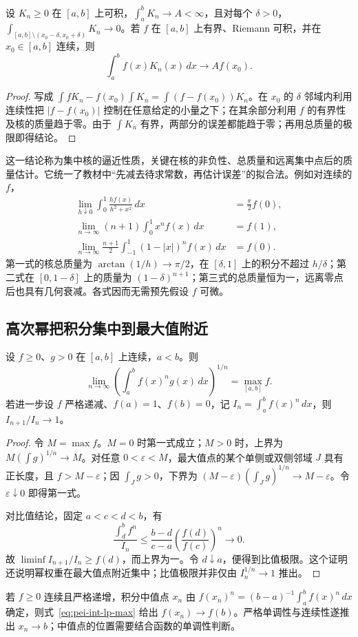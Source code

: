 \begin{theorem}
\label{thm:pei-int-concentrating-kernel}
设 $K_n\ge0$ 在 $[a,b]$ 上可积，$\int_a^bK_n\to A<\infty$，且对每个 $\delta>0$，$\int_{[a,b]\setminus(x_0-\delta,x_0+\delta)}K_n\to0$。若 $f$ 在 $[a,b]$ 上有界、Riemann 可积，并在 $x_0\in[a,b]$ 连续，则
\[
 \int_a^b f(x)K_n(x)\,dx\longrightarrow Af(x_0).
\]
\end{theorem}
\begin{proof}
写成 $\int fK_n-f(x_0)\int K_n=\int(f-f(x_0))K_n$。在 $x_0$ 的 $\delta$ 邻域内利用连续性把 $|f-f(x_0)|$ 控制在任意给定的小量之下；在其余部分利用 $f$ 的有界性及核的质量趋于零。由于 $\int K_n$ 有界，两部分的误差都能趋于零；再用总质量的极限即得结论。
\end{proof}
这一结论称为集中核的逼近性质，关键在核的非负性、总质量和远离集中点后的质量估计。它统一了教材中“先减去待求常数，再估计误差”的拟合法。例如对连续的 $f$，
\begin{align*}
 \lim_{h\downarrow0}\int_0^1\frac{h f(x)}{h^2+x^2}\,dx&=\frac\pi2f(0),\\
 \lim_{n\to\infty}(n+1)\int_0^1x^nf(x)\,dx&=f(1),\\
 \lim_{n\to\infty}\frac{n+1}{2}\int_{-1}^1(1-|x|)^nf(x)\,dx&=f(0).
\end{align*}
第一式的核总质量为 $\arctan(1/h)\to\pi/2$，在 $[\delta,1]$ 上的积分不超过 $h/\delta$；第二式在 $[0,1-\delta]$ 上的质量为 $(1-\delta)^{n+1}$；第三式的总质量恒为一，远离零点后也具有几何衰减。各式因而无需预先假设 $f$ 可微。

\subsection{高次幂把积分集中到最大值附近}
\begin{theorem}
\label{thm:pei-int-power-integral}
设 $f\ge0$、$g>0$ 在 $[a,b]$ 上连续，$a<b$。则
\begin{equation}
 \lim_{n\to\infty}\left(\int_a^bf(x)^ng(x)\,dx\right)^{1/n}
 =\max_{[a,b]}f.
 \label{eq:pei-int-lp-max}
\end{equation}
若进一步设 $f$ 严格递减、$f(a)=1$、$f(b)=0$，记 $I_n=\int_a^bf(x)^n\,dx$，则 $I_{n+1}/I_n\to1$。
\end{theorem}
\begin{proof}
令 $M=\max f$。$M=0$ 时第一式成立；$M>0$ 时，上界为 $M(\int g)^{1/n}\to M$。对任意 $0<\varepsilon<M$，最大值点的某个单侧或双侧邻域 $J$ 具有正长度，且 $f>M-\varepsilon$；因 $\int_Jg>0$，下界为 $(M-\varepsilon)(\int_Jg)^{1/n}\to M-\varepsilon$。令 $\varepsilon\downarrow0$ 即得第一式。

对比值结论，固定 $a<c<d<b$，有
\[
 \frac{\int_d^bf^n}{I_n}\le\frac{b-d}{c-a}\left(\frac{f(d)}{f(c)}\right)^n\longrightarrow0.
\]
故 $\liminf I_{n+1}/I_n\ge f(d)$，而上界为一。令 $d\downarrow a$，便得到比值极限。这个证明还说明幂权重在最大值点附近集中；比值极限并非仅由 $I_n^{1/n}\to1$ 推出。
\end{proof}
若 $f\ge0$ 连续且严格递增，积分中值点 $x_n$ 由 $f(x_n)^n=(b-a)^{-1}\int_a^bf(x)^n\,dx$ 确定，则式~\eqref{eq:pei-int-lp-max} 给出 $f(x_n)\to f(b)$。严格单调性与连续性遂推出 $x_n\to b$；中值点的位置需要结合函数的单调性判断。

